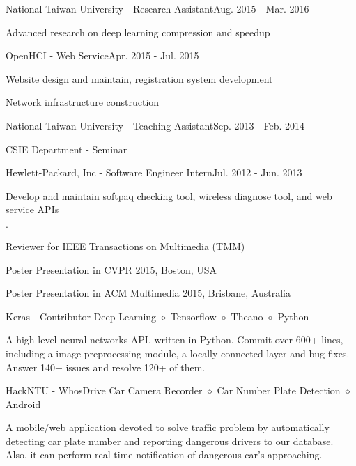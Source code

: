 \documentclass{joel_cv}
\begin{document}
\begin{profExp}{National Taiwan University - Research Assistant}{Aug. 2015 - Mar. 2016}
	\item Advanced research on deep learning compression and speedup
\end{profExp}

\begin{profExp}{OpenHCI - Web Service}{Apr. 2015 - Jul. 2015}
	\item Website design and maintain, registration system development
	\item Network infrastructure construction
\end{profExp}
\pagebreak
\begin{profExp}{National Taiwan University - Teaching Assistant}{Sep. 2013 - Feb. 2014}
	\item CSIE Department - Seminar
\end{profExp}

\begin{profExp}{Hewlett-Packard, Inc - Software Engineer Intern}{Jul. 2012 - Jun. 2013}
	\item Develop and maintain softpaq checking tool, wireless diagnose tool, and web service APIs
\end{profExp}

%
%

\begin{sectionItemize}{$\cdot$}
	\item Reviewer for IEEE Transactions on Multimedia (TMM)
	\item Poster Presentation in CVPR 2015, Boston, USA
	\item Poster Presentation in ACM Multimedia 2015, Brisbane, Australia
\end{sectionItemize}

%
%


\begin{proj}{Keras - Contributor}
	{Deep Learning $\diamond$ Tensorflow $\diamond$ Theano $\diamond$ Python}
	\item A high-level neural networks API, written in Python. Commit over 600+ lines, including a image preprocessing module, a locally connected layer and bug fixes. Answer 140+ issues and resolve 120+ of them.
\end{proj}

\begin{proj}{HackNTU - WhosDrive}
	{Car Camera Recorder $\diamond$ Car Number Plate Detection $\diamond$ Android}
	\item A mobile/web application devoted to solve traffic problem by automatically detecting car plate number and reporting dangerous drivers to our database. Also, it can perform real-time notification of dangerous car's approaching.
\end{proj}
\end{document}
